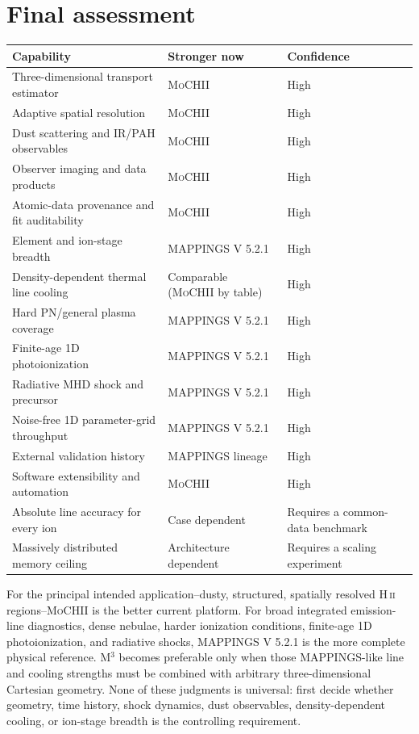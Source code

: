 \documentclass[english,a4paper]{my_memo}
\newcommand{\MoCHII}{\textsc{MoCHII}}
\newcommand{\Mthree}{M$^3$}
\newcommand{\Mappings}{MAPPINGS V 5.2.1}
\begin{document}
\section{Final assessment}

\begin{center}
\begin{tabular}{P{0.46\textwidth}P{0.20\textwidth}P{0.20\textwidth}}
\toprule
Capability & Stronger now & Confidence \\
\midrule
Three-dimensional transport estimator & \MoCHII{} & High \\
Adaptive spatial resolution & \MoCHII{} & High \\
Dust scattering and IR/PAH observables & \MoCHII{} & High \\
Observer imaging and data products & \MoCHII{} & High \\
Atomic-data provenance and fit auditability & \MoCHII{} & High \\
Element and ion-stage breadth & \Mappings{} & High \\
Density-dependent thermal line cooling & Comparable (\MoCHII{} by table) & High \\
Hard PN/general plasma coverage & \Mappings{} & High \\
Finite-age 1D photoionization & \Mappings{} & High \\
Radiative MHD shock and precursor & \Mappings{} & High \\
Noise-free 1D parameter-grid throughput & \Mappings{} & High \\
External validation history & MAPPINGS lineage & High \\
Software extensibility and automation & \MoCHII{} & High \\
Absolute line accuracy for every ion & Case dependent & Requires a
common-data benchmark \\
Massively distributed memory ceiling & Architecture dependent & Requires
a scaling experiment \\
\bottomrule
\end{tabular}
\end{center}

For the principal intended application--dusty, structured, spatially
resolved H\,\textsc{ii} regions--\MoCHII{} is the better current platform.
For broad integrated emission-line diagnostics, dense nebulae, harder
ionization conditions, finite-age 1D photoionization, and radiative shocks,
\Mappings{} is the more complete physical reference.  \Mthree{} becomes
preferable only when those MAPPINGS-like line and cooling strengths must be
combined with arbitrary three-dimensional Cartesian geometry.  None of
these judgments is universal: first decide whether geometry, time history,
shock dynamics, dust observables, density-dependent cooling, or ion-stage
breadth is the controlling requirement.
\end{document}
